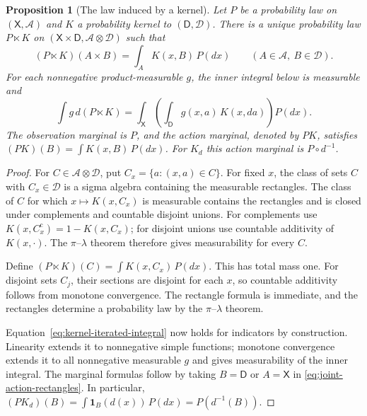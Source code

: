 \documentclass[11pt,oneside]{book}
\newtheorem{proposition}[theorem]{Proposition}
\theoremstyle{definition}
\theoremstyle{remark}
\begin{document}
\begin{proposition}[The law induced by a kernel]
\label{prop:joint-action-law}
Let $P$ be a probability law on $(\mathsf X,\mathcal A)$ and $K$ a
probability kernel to $(\mathsf D,\mathcal D)$. There is a unique probability
law $P\ltimes K$ on $(\mathsf X\times\mathsf D,\mathcal A\otimes\mathcal D)$
such that
\begin{equation}
(P\ltimes K)(A\times B)=\int_A K(x,B)\,P(dx)
\qquad(A\in\mathcal A,\ B\in\mathcal D).
\label{eq:joint-action-rectangles}
\end{equation}
For each nonnegative product-measurable $g$, the inner integral below is
measurable and
\begin{equation}
\int g\,d(P\ltimes K)
=\int_{\mathsf X}\left(\int_{\mathsf D} g(x,a)\,K(x,da)\right)P(dx).
\label{eq:kernel-iterated-integral}
\end{equation}
The observation marginal is $P$, and the action marginal, denoted by
$PK$, satisfies $(PK)(B)=\int K(x,B)\,P(dx)$.
For $K_d$ this action marginal is $P\circ d^{-1}$.
\end{proposition}
\begin{proof}
For $C\in\mathcal A\otimes\mathcal D$, put
$C_x=\{a:(x,a)\in C\}$. For fixed $x$, the class of sets $C$ with
$C_x\in\mathcal D$ is a sigma algebra containing the measurable rectangles.
The class of $C$ for which $x\mapsto K(x,C_x)$ is measurable contains the
rectangles and is closed under complements and countable disjoint unions.
For complements use $K(x,C_x^{\mathrm c})=1-K(x,C_x)$; for disjoint
unions use countable additivity of $K(x,\cdot)$.
The $\pi$--$\lambda$ theorem therefore gives measurability for every $C$.

Define $(P\ltimes K)(C)=\int K(x,C_x)\,P(dx)$. This has total mass one.
For disjoint sets $C_j$, their sections are disjoint for each $x$,
so countable additivity follows from monotone convergence. The rectangle
formula is immediate, and the rectangles determine a probability law
by the $\pi$--$\lambda$ theorem.

Equation~\eqref{eq:kernel-iterated-integral} now holds for indicators
by construction. Linearity extends it to nonnegative simple functions;
monotone convergence extends it to all nonnegative measurable $g$ and
gives measurability of the inner integral. The marginal formulas follow
by taking $B=\mathsf D$ or $A=\mathsf X$ in
\eqref{eq:joint-action-rectangles}. In particular,
$(PK_d)(B)=\int\mathbf 1_B(d(x))\,P(dx)=P(d^{-1}(B))$.
\end{proof}
\end{document}

